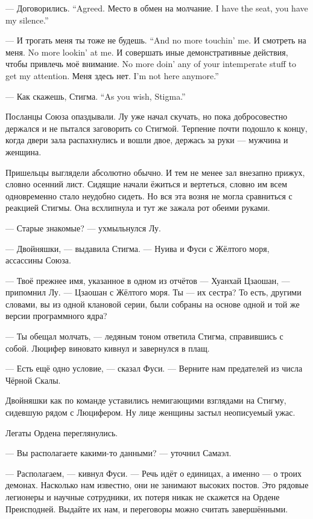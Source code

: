 {--- Договорились.}
{``Agreed.}
{Место в обмен на молчание.}
{I have the seat, you have my silence.''}

{--- И трогать меня ты тоже не будешь.}
{``And no more touchin' me.}
{И смотреть на меня.}
{No more lookin' at me.}
{И совершать иные демонстративные действия, чтобы привлечь моё внимание.}
{No more doin' any of your intemperate stuff to get my attention.}
{Меня здесь нет.}
{I'm not here anymore.''}

{--- Как скажешь, Стигма.}
{``As you wish, Stigma.''}

Посланцы Союза опаздывали.
Лу уже начал скучать, но пока добросовестно держался и не пытался заговорить со Стигмой.
Терпение почти подошло к концу, когда двери зала распахнулись и вошли двое, держась за руки --- мужчина и женщина.

Пришельцы выглядели абсолютно обычно.
И тем не менее зал внезапно прижух, словно осенний лист.
Сидящие начали ёжиться и вертеться, словно им всем одновременно стало неудобно сидеть.
Но вся эта возня не могла сравниться с реакцией Стигмы.
Она всхлипнула и тут же зажала рот обеими руками.

--- Старые знакомые? --- ухмыльнулся Лу.

--- Двойняшки, --- выдавила Стигма.
--- Нуива и Фуси с Жёлтого моря, ассассины Союза.

--- Твоё прежнее имя, указанное в одном из отчётов --- Хуанхай Цзаошан, --- припомнил Лу.
--- Цзаошан с Жёлтого моря.
Ты --- их сестра?
То есть, другими словами, вы из одной клановой серии, были собраны на основе одной и той же версии программного ядра?

--- Ты обещал молчать, --- ледяным тоном ответила Стигма, справившись с собой.
Люцифер виновато кивнул и завернулся в плащ.

\textspace

--- Есть ещё одно условие, --- сказал Фуси.
--- Верните нам предателей из числа Чёрной Скалы.

Двойняшки как по команде уставились немигающими взглядами на Стигму, сидевшую рядом с Люцифером.
Ну лице женщины застыл неописуемый ужас.

Легаты Ордена переглянулись.

--- Вы располагаете какими-то данными? --- уточнил Самаэл.

--- Располагаем, --- кивнул Фуси.
--- Речь идёт о единицах, а именно --- о троих демонах.
Насколько нам известно, они не занимают высоких постов.
Это рядовые легионеры и научные сотрудники, их потеря никак не скажется на Ордене Преисподней.
Выдайте их нам, и переговоры можно считать завершёнными.

